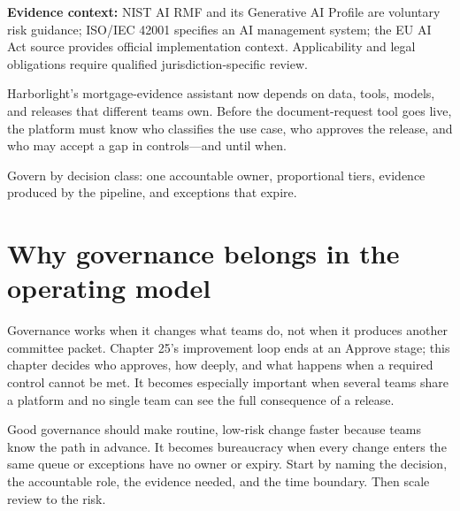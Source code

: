 

\begin{bookquote}

\textbf{Evidence context:} NIST AI RMF and its Generative AI Profile are voluntary risk guidance; ISO/IEC 42001 specifies an AI management system; the EU AI Act source provides official implementation context. Applicability and legal obligations require qualified jurisdiction-specific review. \textbf{}

\end{bookquote}

\begin{bookcallout}
Harborlight's mortgage-evidence assistant now depends on data, tools, models, and releases that different teams own. Before the document-request tool goes live, the platform must know who classifies the use case, who approves the release, and who may accept a gap in controls—and until when.
\end{bookcallout}

\begin{bookcallout}
Govern by decision class: one accountable owner, proportional tiers, evidence produced by the pipeline, and exceptions that expire.
\end{bookcallout}

\section{Why governance belongs in the operating model}

Governance works when it changes what teams do, not when it produces another committee packet. Chapter 25's improvement loop ends at an Approve stage; this chapter decides who approves, how deeply, and what happens when a required control cannot be met. It becomes especially important when several teams share a platform and no single team can see the full consequence of a release.\par

Good governance should make routine, low-risk change faster because teams know the path in advance. It becomes bureaucracy when every change enters the same queue or exceptions have no owner or expiry. Start by naming the decision, the accountable role, the evidence needed, and the time boundary. Then scale review to the risk.\par


